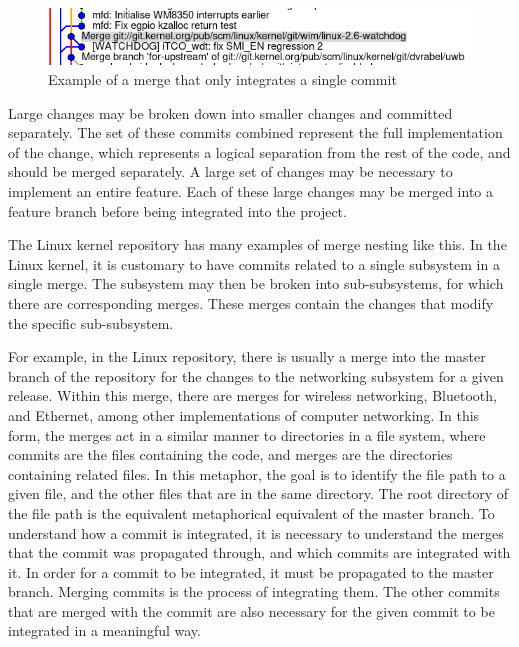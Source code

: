 \begin{figure}[htpb]
  \centering
  \includegraphics[width=0.8\linewidth]{Figures/background/single_commit.png}
  \caption{Example of a merge that only integrates a single commit}
  \label{fig:single_commit_merge}
\end{figure}

Large changes may be broken down into smaller changes and committed
separately.
The set of these commits combined represent the full implementation of
the change,
which represents a logical separation from the rest of the code, and
should be merged separately.
A large set of changes may be necessary to implement an entire feature.
Each of these large changes may be merged into a feature branch before
being integrated into the project.

The Linux kernel repository has many examples of merge nesting like this.
In the Linux kernel, it is customary to have commits related to a single
subsystem in a single merge.
The subsystem may then be broken into sub-subsystems, for which there
are corresponding merges.
These merges contain the changes that modify the specific sub-subsystem.

For example, in the Linux repository, there is usually a merge
into the master branch of the repository for the changes to
the networking subsystem for a given release.
Within this merge, there are merges for wireless networking, Bluetooth,
and Ethernet, among other implementations of computer networking.
In this form, the merges act in a similar manner to directories in a
file system, where commits are the files containing the code, and merges
are the directories containing related files.
In this metaphor, the goal is to identify the file path to a given file,
and the other files that are in the same directory.
The root directory of the file path is the equivalent metaphorical
equivalent of the master branch.
To understand how a commit is integrated, it is necessary to understand
the merges that the commit was propagated through, and which commits are
integrated with it.
In order for a commit to be integrated, it must be propagated to the
master branch.
Merging commits is the process of integrating them.
The other commits that are merged with the commit are also necessary for
the given commit to be integrated in a meaningful way.

